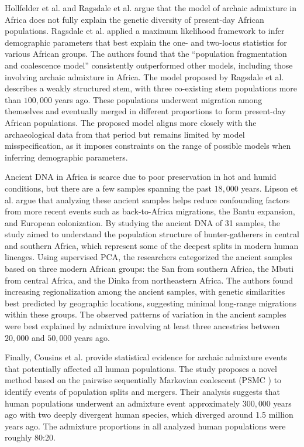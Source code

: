 Hollfelder et al. \cite{hollfelder2021deep} and Ragsdale et al. \cite{ragsdale2023weakly} argue that the model of archaic admixture in Africa does not fully explain the genetic diversity of present-day African populations. Ragsdale et al. applied a maximum likelihood framework to infer demographic parameters that best explain the one- and two-locus statistics for various African groups. The authors found that the ``population fragmentation and coalescence model'' \cite{scerri2019beyond} consistently outperformed other models, including those involving archaic admixture in Africa. The model proposed by Ragsdale et al. describes a weakly structured stem, with three co-existing stem populations more than $100{,}000$ years ago. These populations underwent migration among themselves and eventually merged in different proportions to form present-day African populations. The proposed model aligns more closely with the archaeological data from that period but remains limited by model misspecification, as it imposes constraints on the range of possible models when inferring demographic parameters.

Ancient DNA in Africa is scarce due to poor preservation in hot and humid conditions, but there are a few samples spanning the past $18{,}000$ years. Lipson et al. \cite{lipson2022ancient} argue that analyzing these ancient samples helps reduce confounding factors from more recent events such as back-to-Africa migrations, the Bantu expansion, and European colonization. By studying the ancient DNA of 31 samples, the study aimed to understand the population structure of hunter-gatherers in central and southern Africa, which represent some of the deepest splits in modern human lineages. Using supervised PCA, the researchers categorized the ancient samples based on three modern African groups: the San from southern Africa, the Mbuti from central Africa, and the Dinka from northeastern Africa. The authors found increasing regionalization among the ancient samples, with genetic similarities best predicted by geographic locations, suggesting minimal long-range migrations within these groups. The observed patterns of variation in the ancient samples were best explained by admixture involving at least three ancestries between $20{,}000$ and $50{,}000$ years ago.

Finally, Cousins et al. \cite{cousins2024structured} provide statistical evidence for archaic admixture events that potentially affected all human populations. The study proposes a novel method based on the pairwise sequentially Markovian coalescent (PSMC \cite{li2011inference}) to identify events of population splits and mergers. Their analysis suggests that human populations underwent an admixture event approximately $300{,}000$ years ago with two deeply divergent human species, which diverged around 1.5 million years ago. The admixture proportions in all analyzed human populations were roughly 80:20.

